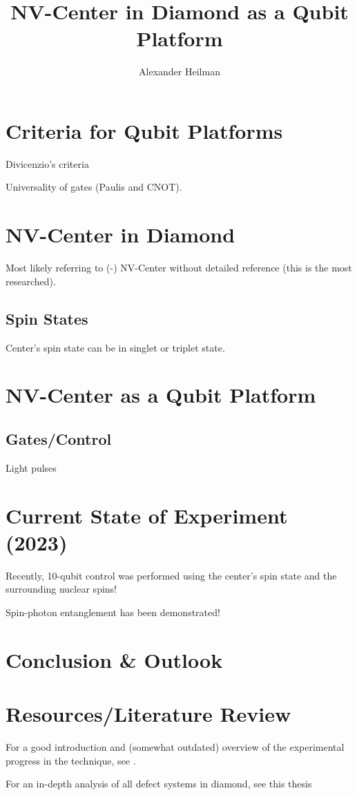 \documentclass[10pt,a4paper]{article}
\title{NV-Center in Diamond as a Qubit Platform}
\author{Alexander Heilman}
\begin{document}
\vspace{-3cm}
 
\maketitle

\begin{multicols}{2}

\section{Criteria for Qubit Platforms}
Divicenzio's criteria

Universality of gates (Paulis and CNOT).

\section{NV-Center in Diamond}
Most likely referring to (-) NV-Center without detailed reference (this is the most researched). 

\subsection{Spin States}
Center's spin state can be in singlet or triplet state.

\section{NV-Center as a Qubit Platform}

\subsection{Gates/Control}
Light pulses


\section{Current State of Experiment (2023)}
Recently, 10-qubit control was performed using the center's spin state and the surrounding nuclear spins!

Spin-photon entanglement has been demonstrated!

\section{Conclusion \& Outlook}

\section{Resources/Literature Review}
For a good introduction and (somewhat outdated) overview of the experimental progress in the technique, see
\cite{childress2013diamond}.

For an in-depth analysis of all defect systems in diamond, see this thesis %
\end{multicols}



 
\end{document}
